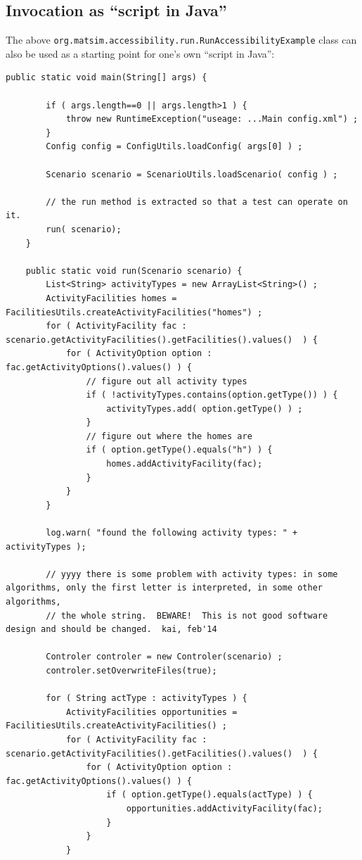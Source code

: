 \subsection{Invocation as ``script in Java''}

The above \lstinline$org.matsim.accessibility.run.RunAccessibilityExample$ class can also be used as a starting point for one's own ``script in Java'':
\begin{lstlisting}
public static void main(String[] args) {

		if ( args.length==0 || args.length>1 ) {
			throw new RuntimeException("useage: ...Main config.xml") ;
		}
		Config config = ConfigUtils.loadConfig( args[0] ) ;
		
		Scenario scenario = ScenarioUtils.loadScenario( config ) ;
		
		// the run method is extracted so that a test can operate on it.
		run( scenario);
	}
	
	public static void run(Scenario scenario) {
		List<String> activityTypes = new ArrayList<String>() ;
		ActivityFacilities homes = FacilitiesUtils.createActivityFacilities("homes") ;
		for ( ActivityFacility fac : scenario.getActivityFacilities().getFacilities().values()  ) {
			for ( ActivityOption option : fac.getActivityOptions().values() ) {
				// figure out all activity types
				if ( !activityTypes.contains(option.getType()) ) {
					activityTypes.add( option.getType() ) ;
				}
				// figure out where the homes are
				if ( option.getType().equals("h") ) {
					homes.addActivityFacility(fac);
				}
			}
		}
		
		log.warn( "found the following activity types: " + activityTypes ); 
		
		// yyyy there is some problem with activity types: in some algorithms, only the first letter is interpreted, in some other algorithms,
		// the whole string.  BEWARE!  This is not good software design and should be changed.  kai, feb'14
		
		Controler controler = new Controler(scenario) ;
		controler.setOverwriteFiles(true);

		for ( String actType : activityTypes ) {
			ActivityFacilities opportunities = FacilitiesUtils.createActivityFacilities() ;
			for ( ActivityFacility fac : scenario.getActivityFacilities().getFacilities().values()  ) {
				for ( ActivityOption option : fac.getActivityOptions().values() ) {
					if ( option.getType().equals(actType) ) {
						opportunities.addActivityFacility(fac);
					}
				}
			}
			

\end{lstlisting}
